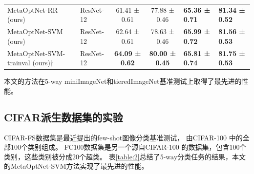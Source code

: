 \begin{table}[htbp]
{\begin{tabular}{
    l 
    l 
    c 
    c 
    l 
    l }
    MetaOptNet-RR (ours)                             & ResNet-12 & 61.41 ± 0.61                                                      & 77.88 ± 0.46                                                      & \textbf{65.36 ± 0.71}                                       & \textbf{81.34 ± 0.52}                                       \\
    MetaOptNet-SVM (ours)                            & ResNet-12                         & 62.64 ± 0.61                                                      & 78.63 ± 0.46                                                      & \textbf{65.99 ± 0.72}                                       & \textbf{81.56 ± 0.53}                                       \\
    MetaOptNet-SVM-trainval (ours)†                  & ResNet-12                         & \textbf{64.09 ± 0.62} & \textbf{80.00 ± 0.45} & \textbf{65.81 ± 0.74}                                       & \textbf{81.75 ± 0.53}                                       \\
    \bottomrule
    \end{tabular}
    }
    \label{table:1}
\end{table}
本文的方法在5-way miniImageNet和tieredImageNet基准测试上取得了最先进的性能。


\subsection{CIFAR派生数据集的实验}

CIFAR-FS数据集是最近提出的few-shot图像分类基准测试，
由CIFAR-100 中的全部100个类别组成。
FC100数据集是另一个源自CIFAR-100 的数据集，包含100个类别，这些类别被分成20个超类。
表\ref{table:2}总结了5-way分类任务的结果，本文的MetaOptNet-SVM方法实现了最先进的性能。

